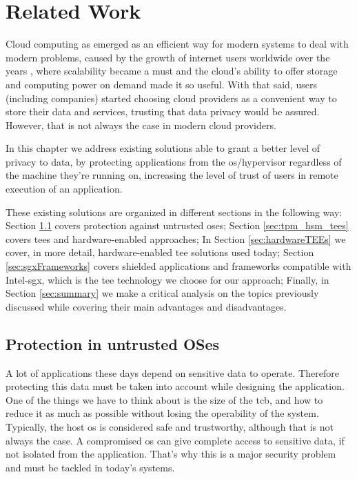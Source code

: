 \chapter{Related Work}
\label{cha:related_work}

Cloud computing as emerged as an efficient way for modern systems to deal with modern problems, caused by the growth of internet users worldwide over the years \cite{growthInternetUsers}, where scalability became a must and the cloud's ability to offer storage and computing power on demand made it so useful.
With that said, users (including companies) started choosing cloud providers as a convenient way to store their data and services, trusting that data privacy would be assured. However, that is not always the case in modern cloud providers. 

In this chapter we address existing solutions able to grant a better level of privacy to data, by protecting applications from the \gls{os}/hypervisor regardless of the machine they're running on, increasing the level of trust of users in remote execution of an application.

These existing solutions are organized in different sections in the following way: 
Section \ref{sec:protect_untrustOS} covers protection against untrusted \gls{os}es; 
Section \ref{sec:tpm_hsm_tees} covers \gls{tee}s and hardware-enabled approaches;
In Section \ref{sec:hardwareTEEs} we cover, in more detail, hardware-enabled \gls{tee} solutions used today;
Section \ref{sec:sgxFrameworks} covers shielded applications and frameworks compatible with Intel-\gls{sgx}, which is the \gls{tee} technology we choose for our approach;
Finally, in Section \ref{sec:summary} we make a critical analysis on the topics previously discussed while covering their main advantages and disadvantages.




\section{Protection in untrusted OSes}
\label{sec:protect_untrustOS}

A lot of applications these days depend on sensitive data to operate. Therefore protecting this data must be taken into account while designing the application. 
One of the things we have to think about is the size of the \gls{tcb}, and how to reduce it as much as possible without losing the operability of the system. 
Typically, the host \gls{os} is considered safe and trustworthy, although that is not always the case. A compromised \gls{os} can give complete access to sensitive data, if not isolated from the application. That’s why this is a major security problem and must be tackled in today’s systems.

